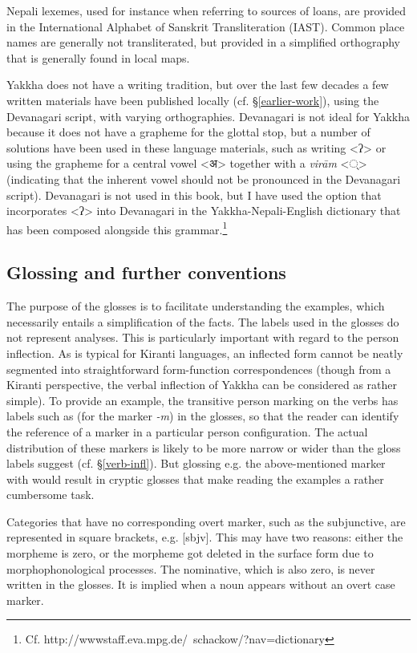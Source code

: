 Nepali lexemes, used for instance when referring to sources of loans, are provided in the International Alphabet of Sanskrit Transliteration (IAST). Common place names are generally not transliterated, but provided in a simplified orthography that is generally found in local maps.

Yakkha does not have a writing tradition, but over the last few decades a few written materials have been published locally (cf. §\ref{earlier-work}), using the Devanagari script, with varying orthographies. Devanagari is not ideal for Yakkha because it does not have a grapheme for the glottal stop, but a number of solutions have been used in these language materials, such as writing <ʔ>  or using the grapheme for a central vowel <{\Deva अ}> together with a \emph{virām} <{\Deva  ्}>  (indicating that the inherent vowel should not be pronounced in the Devanagari script).  Devanagari is not used in this book, but  I have used the option that incorporates <ʔ> into Devanagari in the Yakkha-Nepali-English dictionary that has been composed alongside this grammar.\footnote{Cf. http://wwwstaff.eva.mpg.de/~schackow/?nav=dictionary}


\subsection{Glossing and further conventions}

The purpose of the glosses is to facilitate understanding the examples, which necessarily entails a simplification of the facts. The labels used in the glosses do not represent analyses. This is particularly important with regard to the person inflection. As is typical for Kiranti languages, an inflected form cannot be neatly segmented into straightforward form-function correspondences (though from a  Kiranti perspective, the verbal inflection of Yakkha can be considered as rather simple). To provide an example, the transitive person marking on the verbs has labels such as  (for the marker \emph{-m}) in the glosses, so that the reader can identify the reference of a marker in a particular person configuration. The actual distribution of these markers is likely to be more narrow or wider than the gloss labels suggest (cf. §\ref{verb-infl}). But glossing e.g. the above-mentioned marker with   would result in cryptic glosses that make reading the examples a rather cumbersome task. 

Categories that have no corresponding overt marker, such as the subjunctive, are represented in square brackets, e.g. [{\sc sbjv}]. This may have two reasons: either the morpheme is zero, or the morpheme got deleted in the surface form due to morphophonological processes. The nominative, which is also zero, is never written in the glosses. It is implied when a noun appears without an overt case marker. 

